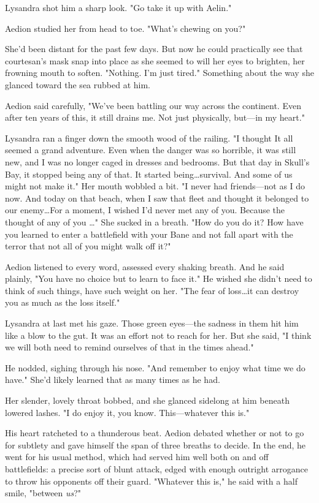 Lysandra shot him a sharp look.
"Go take it up with Aelin."

Aedion studied her from head to toe.
"What's chewing on you?"

She'd been distant for the past few days.
But now he could practically see that courtesan's mask snap into place as she seemed to will her eyes to brighten, her frowning mouth to soften.
"Nothing.
I'm just tired."
Something about the way she glanced toward the sea rubbed at him.

Aedion said carefully, "We've been battling our way across the continent.
Even after ten years of this, it still drains me.
Not just physically, but---in my heart."

Lysandra ran a finger down the smooth wood of the railing.
"I thought  It all seemed a grand adventure.
Even when the danger was so horrible, it was still new, and I was no longer caged in dresses and bedrooms.
But that day in Skull's Bay, it stopped being any of that.
It started being\ldots survival.
And some of us might not make it."
Her mouth wobbled a bit.
"I never had friends---not as I do now.
And today on that beach, when I saw that fleet and thought it belonged to our enemy\ldots For a moment, I wished I'd never met any of you.
Because the thought of any of you \ldots" She sucked in a breath.
"How do you do it?
How have you learned to enter a battlefield with your Bane and not fall apart with the terror that not all of you might walk off it?"

Aedion listened to every word, assessed every shaking breath.
And he said plainly, "You have no choice but to learn to face it."
He wished she didn't need to think of such things, have such weight on her.
"The fear of loss\ldots it can destroy you as much as the loss itself."

Lysandra at last met his gaze.
Those green eyes---the sadness in them hit him like a blow to the gut.
It was an effort not to reach for her.
But she said, "I think we will both need to remind ourselves of that in the times ahead."

He nodded, sighing through his nose.
"And remember to enjoy what time we do have."
She'd likely learned that as many times as he had.

Her slender, lovely throat bobbed, and she glanced sidelong at him beneath lowered lashes.
"I do enjoy it, you know.
This---whatever this is."

His heart ratcheted to a thunderous beat.
Aedion debated whether or not to go for subtlety and gave himself the span of three breaths to decide.
In the end, he went for his usual method, which had served him well both on and off battlefields: a precise sort of blunt attack, edged with enough outright arrogance to throw his opponents off their guard.
"Whatever this is," he said with a half smile, "between \emph{us}?"

